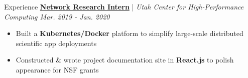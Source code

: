 \documentclass{resume/resume}
\begin{document}
\begin{rSection}{Experience}
  \href{https://slateci.io/}{\bf Network Research Intern} | {\em Utah Center for High-Performance Computing \hfill Mar. 2019 - Jan. 2020}
  \vspace{-6pt}
  \begin{itemize}[nosep]
    \item Built a {\bf Kubernetes/Docker} platform to simplify large-scale distributed scientific app deployments
    \item Constructed \& wrote project documentation site in {\bf React.js} to polish appearance for NSF grants
  \end{itemize}
  
  

  

\end{rSection}
\end{document}
